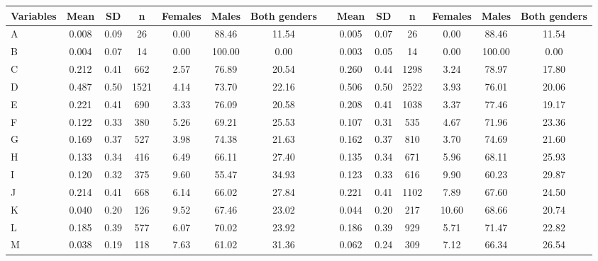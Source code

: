 \begin{tabular}{lccccccccccccc}
\toprule
Variables & Mean & SD & n & Females & Males & Both genders &  \multicolumn{1}{l}{} & Mean & SD & n & Females & Males & Both genders \\
\midrule
\hspace{3mm}A & 0.008 & 0.09 & 26 & 0.00 & 88.46 & 11.54 &   & 0.005 & 0.07 & 26 & 0.00 & 88.46 & 11.54 \\
\hspace{3mm}B & 0.004 & 0.07 & 14 & 0.00 & 100.00 & 0.00 &   & 0.003 & 0.05 & 14 & 0.00 & 100.00 & 0.00 \\
\hspace{3mm}C & 0.212 & 0.41 & 662 & 2.57 & 76.89 & 20.54 &   & 0.260 & 0.44 & 1298 & 3.24 & 78.97 & 17.80 \\
\hspace{3mm}D & 0.487 & 0.50 & 1521 & 4.14 & 73.70 & 22.16 &   & 0.506 & 0.50 & 2522 & 3.93 & 76.01 & 20.06 \\
\hspace{3mm}E & 0.221 & 0.41 & 690 & 3.33 & 76.09 & 20.58 &   & 0.208 & 0.41 & 1038 & 3.37 & 77.46 & 19.17 \\
\hspace{3mm}F & 0.122 & 0.33 & 380 & 5.26 & 69.21 & 25.53 &   & 0.107 & 0.31 & 535 & 4.67 & 71.96 & 23.36 \\
\hspace{3mm}G & 0.169 & 0.37 & 527 & 3.98 & 74.38 & 21.63 &   & 0.162 & 0.37 & 810 & 3.70 & 74.69 & 21.60 \\
\hspace{3mm}H & 0.133 & 0.34 & 416 & 6.49 & 66.11 & 27.40 &   & 0.135 & 0.34 & 671 & 5.96 & 68.11 & 25.93 \\
\hspace{3mm}I & 0.120 & 0.32 & 375 & 9.60 & 55.47 & 34.93 &   & 0.123 & 0.33 & 616 & 9.90 & 60.23 & 29.87 \\
\hspace{3mm}J & 0.214 & 0.41 & 668 & 6.14 & 66.02 & 27.84 &   & 0.221 & 0.41 & 1102 & 7.89 & 67.60 & 24.50 \\
\hspace{3mm}K & 0.040 & 0.20 & 126 & 9.52 & 67.46 & 23.02 &   & 0.044 & 0.20 & 217 & 10.60 & 68.66 & 20.74 \\
\hspace{3mm}L & 0.185 & 0.39 & 577 & 6.07 & 70.02 & 23.92 &   & 0.186 & 0.39 & 929 & 5.71 & 71.47 & 22.82 \\
\hspace{3mm}M & 0.038 & 0.19 & 118 & 7.63 & 61.02 & 31.36 &   & 0.062 & 0.24 & 309 & 7.12 & 66.34 & 26.54 \\

\end{tabular}
